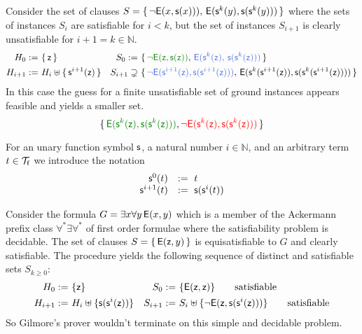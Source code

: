\begin{example}\label{ex:unsatE2}
	Consider the set of clauses 
	$S =
	\{\,
	{ \lnot{\mathsf{E}}(x, {\mathsf s}(x)))},\, 
	{ {\mathsf{E}}({\mathsf s}^k(y), {\mathsf s}({\mathsf s}^k(y)))}
	\,\}$ 
	where the sets of instances $S_i$ are satisfiable for $i<k$,
	but the set of instances $S_{i+1}$ is clearly unsatisfiable for $i+1 = k\in\mathbb{N}$.
	\begin{align*}
	H_{0} :=&\ \{\,\mzero\,\} 
	&
	S_{0} :=&\ \{\, 
	{\colHi\lnot\mE(\mzero,\msucc(\mzero))},\,
	{\colEm \mE(\ms^k(\mzero),\,\ms(\ms^k(\mzero)))}
	\,\}
	\\
	H_{i+1} :=&\ H_i \disjointunion \{\,\msucc^{i+1}(\mzero)\,\} 
	&
	S_{i+1} \supsetneq&\
	\{\,
	{\colEm \lnot\mE(\msucc^{i+1}(\mzero),\msucc(\msucc^{i+1}(\mzero)))},\,
	{\mE(\ms^k(\msucc^{i+1}(\mzero)), \ms(\ms^k(\msucc^{i+1}(\mzero))))}
	\,\}
	\end{align*}
	In this case the guess for a finite unsatisfiable set of ground instances appears feasible and yields a smaller set.
	\[
	\{\, 
	{\colHi \mE(\ms^k(\mzero), \ms(\ms^k(\mzero)))},
	{\colLo \lnot\mE(\msucc^{k}(\mzero),\msucc(\msucc^{k}(\mzero)))}		
	\,\}
	\]
\end{example}

\begin{definition}
	For an unary function symbol ${\mathsf s}$, a natural number
	$i\in\mathbb{N}$, and an arbitrary term $t\in{\mathcal T}_{\mathsf f}$ we introduce the notation
	\[
	\begin{array}{rl}
	{\mathsf s}^0(t) &:=\ t \\
	{\mathsf s}^{i+1}(t) &:=\ {\mathsf s}({\mathsf s}^i(t))
	\end{array}
	\]
\end{definition}



\begin{example}\label{ex:satEzy}
	Consider the formula 
	$G = \exists x\forall y\,{\mathsf{E}}(x,y)$
	which is a member of the Ackermann prefix class $\forall^*\exists\forall^*$ 
	of first order formulae
	where the satisfiability problem is decidable.
	The set of clauses 
	$S = \{\,{\mathsf{E}}({\mathsf z},y)\,\}$ is equisatisfiable to $G$ and clearly satisfiable.
	The procedure yields the following sequence of distinct and satisfiable sets $S_{k\geq0}$:
	\begin{align*}
	H_{0} :=&\  \{ {\mathsf z} \} 
	&
	S_{0} :=&\ \{ {\mathsf{E}}({\mathsf z},{\mathsf z})
	\}
	\tag*{satisfiable}
	\\
	H_{i+1} :=&\ H_i \uplus \{ {\mathsf s}({\mathsf s}^{i}({\mathsf z})) \} 
	&
	S_{i+1} :=&\ S_i \uplus 
	\{
	\lnot{\mathsf{E}}({\mathsf z},{\mathsf s}({\mathsf s}^i({\mathsf z})))
	\}
	\tag*{satisfiable}
	\end{align*}
	So Gilmore's prover wouldn't terminate on this simple and decidable problem.
\end{example}



